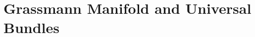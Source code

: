 \documentclass[../main]{subfiles}
\begin{document}
\chapter{Grassmann Manifold and Universal Bundles}\label{ch:5}





\end{document}
